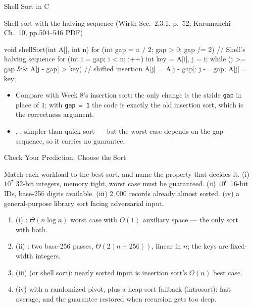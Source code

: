 \documentclass[aspectratio=169]{beamer}
\begin{document}
\begin{frame}[fragile]{Shell Sort in C}
  \scriptsize
  \begin{block}{Shell sort with the halving sequence (Wirth Sec.~2.3.1,
    p.~52; Karumanchi Ch.~10, pp.504--546 PDF)
    \cite{Wirth2004_algorithms_data_structures,Karumanchi2017_data_structures_algorithms_made_easy}}
\begin{semiverbatim}
void shellSort(int A[], int n) {
  for (int gap = n / 2; gap > 0; gap /= 2) {  // Shell's halving sequence
    for (int i = gap; i < n; i++) {
      int key = A[i], j = i;
      while (j >= gap && A[j - gap] > key) {  // shifted insertion
        A[j] = A[j - gap];
        j -= gap;
      }
      A[j] = key;
    }
  }
}
\end{semiverbatim}
  \end{block}
  \vspace{-0.3cm}
  \begin{itemize}
    \item Compare with Week 8's insertion sort: the only change is the stride
      \texttt{gap} in place of $1$; with \texttt{gap = 1} the code is exactly
      the old insertion sort, which is the correctness argument.
    \item {}, , simpler than quick sort --- but
      the worst case depends on the gap sequence, so it carries no guarantee.
  \end{itemize}
\end{frame}

\begin{frame}{Check Your Prediction: Choose the Sort}
  \begin{block}{Match each workload to the best sort, and name the property
    that decides it.}
    (i) $10^7$ 32-bit integers, memory tight, worst case must be guaranteed.
    \quad (ii) $10^6$ 16-bit IDs, base-256 digits available.
    \quad (iii) $2{,}000$ records already almost sorted.
    \quad (iv) a general-purpose library sort facing adversarial input.
  \end{block}
  \begin{enumerate}
    \item (i) : $\Theta(n\log n)$ worst case with $O(1)$
      auxiliary space --- the only sort with both.
    \item (ii) : two base-256 passes, $\Theta(2(n+256))$,
      linear in $n$; the keys are fixed-width integers.
    \item (iii)  (or shell sort): nearly sorted input is
      insertion sort's $O(n)$ best case.
    \item (iv)  with a randomized pivot, plus a heap-sort
      fallback (introsort): fast average, and the guarantee restored when
      recursion gets too deep.
  \end{enumerate}
\end{frame}
\end{document}
